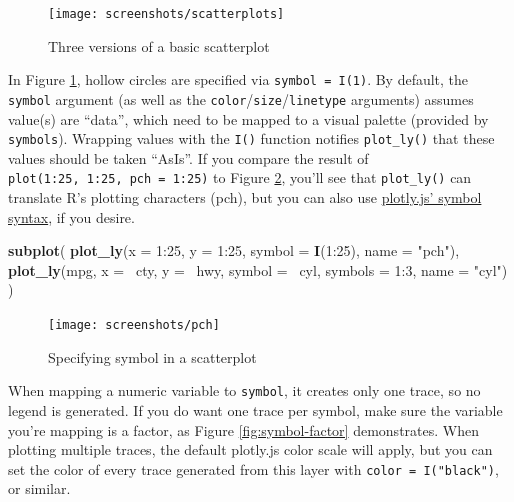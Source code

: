 \documentclass[12pt,]{isuthesis}
\newenvironment{Shaded}{\begin{snugshade}}{\end{snugshade}}
\newcommand{\KeywordTok}[1]{\textcolor[rgb]{0.13,0.29,0.53}{\textbf{{#1}}}}
\newcommand{\DataTypeTok}[1]{\textcolor[rgb]{0.13,0.29,0.53}{{#1}}}
\newcommand{\DecValTok}[1]{\textcolor[rgb]{0.00,0.00,0.81}{{#1}}}
\newcommand{\StringTok}[1]{\textcolor[rgb]{0.31,0.60,0.02}{{#1}}}
\newcommand{\NormalTok}[1]{{#1}}
\begin{document}
\begin{figure}
\centering
\texttt{[image: screenshots/scatterplots]}
\caption{\label{fig:scatterplots}Three versions of a basic scatterplot}
\end{figure}

In Figure \ref{fig:scatterplots}, hollow circles are specified via
\texttt{symbol\ =\ I(1)}. By default, the \texttt{symbol} argument (as
well as the \texttt{color}/\texttt{size}/\texttt{linetype} arguments)
assumes value(s) are ``data'', which need to be mapped to a visual
palette (provided by \texttt{symbols}). Wrapping values with the
\texttt{I()} function notifies \texttt{plot\_ly()} that these values
should be taken ``AsIs''. If you compare the result of
\texttt{plot(1:25,\ 1:25,\ pch\ =\ 1:25)} to Figure \ref{fig:pch},
you'll see that \texttt{plot\_ly()} can translate R's plotting
characters (pch), but you can also use
\href{https://plot.ly/r/reference/\#scatter-marker-symbol}{plotly.js'
symbol syntax}, if you desire.

\begin{Shaded}
\begin{Highlighting}[]
\KeywordTok{subplot}\NormalTok{(}
  \KeywordTok{plot_ly}\NormalTok{(}\DataTypeTok{x =} \DecValTok{1}\NormalTok{:}\DecValTok{25}\NormalTok{, }\DataTypeTok{y =} \DecValTok{1}\NormalTok{:}\DecValTok{25}\NormalTok{, }\DataTypeTok{symbol =} \KeywordTok{I}\NormalTok{(}\DecValTok{1}\NormalTok{:}\DecValTok{25}\NormalTok{), }\DataTypeTok{name =} \StringTok{"pch"}\NormalTok{),}
  \KeywordTok{plot_ly}\NormalTok{(mpg, }\DataTypeTok{x =} \NormalTok{~cty, }\DataTypeTok{y =} \NormalTok{~hwy, }\DataTypeTok{symbol =} \NormalTok{~cyl, }\DataTypeTok{symbols =} \DecValTok{1}\NormalTok{:}\DecValTok{3}\NormalTok{, }\DataTypeTok{name =} \StringTok{"cyl"}\NormalTok{)}
\NormalTok{)}
\end{Highlighting}
\end{Shaded}

\begin{figure}
\centering
\texttt{[image: screenshots/pch]}
\caption{\label{fig:pch}Specifying symbol in a scatterplot}
\end{figure}

When mapping a numeric variable to \texttt{symbol}, it creates only one
trace, so no legend is generated. If you do want one trace per symbol,
make sure the variable you're mapping is a factor, as Figure
\ref{fig:symbol-factor} demonstrates. When plotting multiple traces, the
default plotly.js color scale will apply, but you can set the color of
every trace generated from this layer with
\texttt{color\ =\ I("black")}, or similar.
\end{document}
